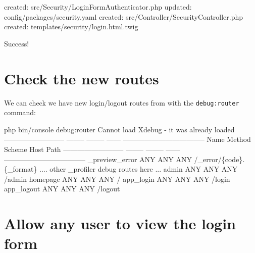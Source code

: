 \documentclass[a4paperpaper,openright]{book}
\newenvironment{Shaded}{}{}
\newcommand{\DataTypeTok}[1]{\textcolor[rgb]{0.56,0.13,0.00}{#1}}
\newcommand{\ExtensionTok}[1]{#1}
\newcommand{\NormalTok}[1]{#1}
\begin{document}
\begin{Shaded}
\begin{Highlighting}[]
     \ExtensionTok{created}\NormalTok{: src/Security/LoginFormAuthenticator.php}
     \ExtensionTok{updated}\NormalTok{: config/packages/security.yaml}
     \ExtensionTok{created}\NormalTok{: src/Controller/SecurityController.php}
     \ExtensionTok{created}\NormalTok{: templates/security/login.html.twig}

      \ExtensionTok{Success}\NormalTok{! }
\end{Highlighting}
\end{Shaded}

\hypertarget{check-the-new-routes}{%
\section{Check the new routes}\label{check-the-new-routes}}

We can check we have new login/logout routes from with the
\texttt{debug:router} command:

\begin{Shaded}
\begin{Highlighting}[]
     \ExtensionTok{php}\NormalTok{ bin/console debug:router}
    \ExtensionTok{Cannot}\NormalTok{ load Xdebug - it was already loaded}
     \ExtensionTok{--------------------------}\NormalTok{ -------- -------- ------ ----------------------------------- }
      \ExtensionTok{Name}\NormalTok{                       Method   Scheme   Host   Path                               }
     \ExtensionTok{--------------------------}\NormalTok{ -------- -------- ------ ----------------------------------- }
      \ExtensionTok{_preview_error}\NormalTok{             ANY      ANY      ANY    /_error/}\DataTypeTok{\{code\}}\NormalTok{.}\DataTypeTok{\{_format\}}           
        \ExtensionTok{....}\NormalTok{ other _profiler debug routes here ...}
      \ExtensionTok{admin}\NormalTok{                      ANY      ANY      ANY    /admin                             }
      \ExtensionTok{homepage}\NormalTok{                   ANY      ANY      ANY    /                                  }
      \ExtensionTok{app_login}\NormalTok{                  ANY      ANY      ANY    /login                             }
      \ExtensionTok{app_logout}\NormalTok{                 ANY      ANY      ANY    /logout          }
\end{Highlighting}
\end{Shaded}

\hypertarget{allow-any-user-to-view-the-login-form}{%
\section{\texorpdfstring{Allow \textbf{any} user to view the login
form}{Allow any user to view the login form}}\label{allow-any-user-to-view-the-login-form}}
\end{document}
